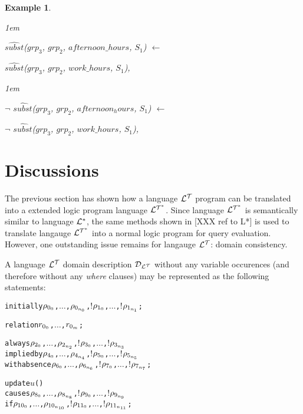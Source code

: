 \documentclass[11pt]{report}
\newtheorem{vexample}{Example}[chapter]
\newenvironment{vverbatim}
{
  \begin{alltt}
}
{
  \vspace{-\baselineskip}
  \end{alltt}
}
\newenvironment{vquote}
{
  \begin{list}{}{\leftmargin 1em}\item[]
}
{
  \end{list}
}
\begin{document}
\begin{vexample}
\begin{enumerate}
              \begin{vquote}
                $\hat{subst}$($grp_3$, $grp_2$, $afternoon\_hours$, $S_1$) $\leftarrow$

                \hspace{1em}
                $\hat{subst}$($grp_3$, $grp_2$, $work\_hours$, $S_1$),
              \end{vquote}

              \begin{vquote}
                $\lnot$ $\hat{subst}$($grp_3$, $grp_2$, $afternoon_hours$, $S_1$) $\leftarrow$

                \hspace{1em}
                $\lnot$ $\hat{subst}$($grp_3$, $grp_2$, $work\_hours$, $S_1$),
              \end{vquote}
          \end{enumerate}
        \end{vexample}

    \section{Discussions}

      The previous section has shown how a language ${\cal L^T}$ program can
      be translated into a extended logic program language ${\cal L^{T^*}}$.
      Since language ${\cal L^{T^*}}$ is semantically similar to language
      ${\cal L^*}$, the same methods shown in [XXX ref to L*] is used to
      translate langauge ${\cal L^{T^*}}$ into a normal logic program for
      query evaluation. However, one outstanding issue remains for langauge
      ${\cal L^T}$: domain consistency.
      
      A language ${\cal L^T}$ domain description ${\cal D}_{\cal L^T}$ without
      any variable occurences (and therefore without any {\em where} clauses)
      may be represented as the following statements:

      \begin{vverbatim}
  initially \(\rho\sb{0\sb{0}}\), \(\ldots\), \(\rho\sb{0\sb{n\sb{0}}}\), \(!\)\(\rho\sb{1\sb{0}}\), \(\ldots\), \(!\)\(\rho\sb{1\sb{n\sb{1}}}\);

  relation \(r\sb{0\sb{0}}\), \(\ldots\), \(r\sb{0\sb{m}}\);

  always \(\rho\sb{2\sb{0}}\), \(\ldots\), \(\rho\sb{2\sb{n\sb{2}}}\), \(!\)\(\rho\sb{3\sb{0}}\), \(\ldots\), \(!\)\(\rho\sb{3\sb{n\sb{3}}}\)
    implied by \(\rho\sb{4\sb{0}}\), \(\ldots\), \(\rho\sb{4\sb{n\sb{4}}}\), \(!\)\(\rho\sb{5\sb{0}}\), \(\ldots\), \(!\)\(\rho\sb{5\sb{n\sb{5}}}\)
    with absence \(\rho\sb{6\sb{0}}\), \(\ldots\), \(\rho\sb{6\sb{n\sb{6}}}\), \(!\)\(\rho\sb{7\sb{0}}\), \(\ldots\), \(!\)\(\rho\sb{7\sb{n\sb{7}}}\);

  update \(u\)()
    causes \(\rho\sb{8\sb{0}}\), \(\ldots\), \(\rho\sb{8\sb{n\sb{8}}}\), \(!\)\(\rho\sb{9\sb{0}}\), \(\ldots\), \(!\)\(\rho\sb{9\sb{n\sb{9}}}\) 
    if \(\rho\sb{10\sb{0}}\), \(\ldots\), \(\rho\sb{10\sb{n\sb{10}}}\), \(!\)\(\rho\sb{11\sb{0}}\), \(\ldots\), \(!\)\(\rho\sb{11\sb{n\sb{11}}}\);
      \end{vverbatim}
\end{document}
